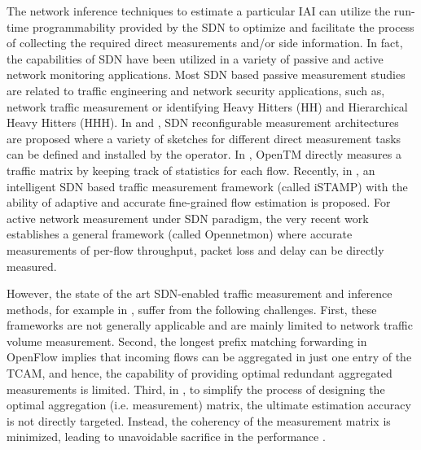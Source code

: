 The network inference techniques to estimate a particular IAI can
utilize the run-time programmability provided by the SDN to optimize
and facilitate the process of collecting the required direct
measurements and/or side information. In fact, the capabilities of SDN
have been utilized in a variety of passive and active network
monitoring applications. Most SDN based passive measurement studies
are related to traffic engineering and network security applications,
such as, network traffic measurement or identifying Heavy Hitters (HH)
and Hierarchical Heavy Hitters (HHH). In \cite{MYu:2011} and
\cite{MYu:2013}, SDN reconfigurable measurement architectures are
proposed where a variety of sketches for different direct measurement
tasks can be defined and installed by the operator. In
\cite{Tootoonchian:2010}, OpenTM directly measures a traffic matrix by
keeping track of statistics for each flow. Recently, in
\cite{IF14iSTAMP:2014}, an intelligent SDN based traffic measurement
framework (called iSTAMP) with the ability of adaptive and accurate
fine-grained flow estimation is proposed. For active network
measurement under SDN paradigm, the very recent work
\cite{Adrichen:2014} establishes a general framework (called
Opennetmon) where accurate measurements of per-flow throughput, packet
loss and delay can be directly measured.

However, the state of the art SDN-enabled traffic measurement and
inference methods, for example in \cite{MYu:2013}
\cite{IF14iSTAMP:2014}, suffer from the following challenges. First,
these frameworks are not generally applicable and are mainly limited
to network traffic volume measurement. Second, the longest prefix matching
forwarding in OpenFlow implies that incoming flows can be aggregated
in just one entry of the TCAM, and hence, the capability of providing
optimal redundant aggregated measurements is limited. Third, in
\cite{IF14iSTAMP:2014}, to simplify the process of designing the
optimal aggregation (i.e. measurement) matrix, the ultimate estimation
accuracy is not directly targeted. Instead, the coherency of the
measurement matrix is minimized, leading to unavoidable sacrifice in
the performance \cite{IF14iSTAMP:2014}\cite{Elad:2007}.

